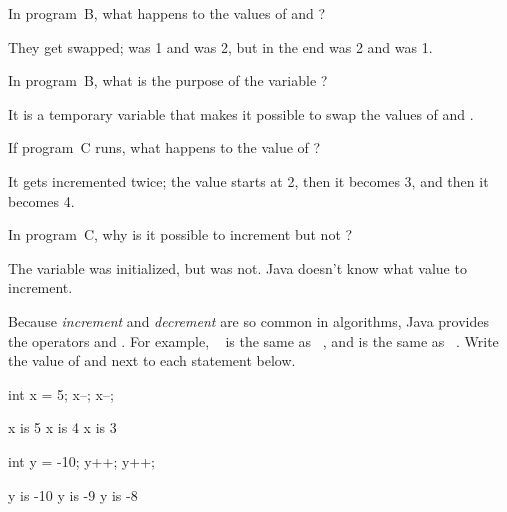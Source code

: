 \Q In program~\textsf{B}, what happens to the values of  and ?

\begin{answer}
They get swapped;  was 1 and  was 2, but in the end  was 2 and  was 1.
\end{answer}


\Q In program~\textsf{B}, what is the purpose of the variable ?

\begin{answer}
It is a temporary variable that makes it possible to swap the values of  and .
\end{answer}


\Q If program~\textsf{C} runs, what happens to the value of ?

\begin{answer}
It gets incremented twice; the value starts at 2, then it becomes 3, and then it becomes 4.
\end{answer}


\Q In program~\textsf{C}, why is it possible to increment  but not ?

\begin{answer}
The variable  was initialized, but  was not.
Java doesn't know what value to increment.
\end{answer}


\Q Because \emph{increment} and \emph{decrement} are so common in algorithms, Java provides the operators \java{++} and \java{--}.
For example, ~ is the same as ~, and  is the same as ~.
Write the value of  and  next to each statement below.

\vspace{-1ex}
\hspace{2em}
\begin{minipage}[t]{100pt}
\begin{javalst}
int x = 5;
x--;
x--;
\end{javalst}
\end{minipage}
\begin{minipage}[t]{100pt}
\begin{answer}
\begin{javaans}
x is 5
x is 4
x is 3
\end{javaans}
\end{answer}
\end{minipage}
\begin{minipage}[t]{100pt}
\begin{javalst}
int y = -10;
y++;
y++;
\end{javalst}
\end{minipage}
\begin{minipage}[t]{100pt}
\begin{answer}
\begin{javaans}
y is -10
y is -9
y is -8
\end{javaans}
\end{answer}
\end{minipage}
\vspace{2pt}


